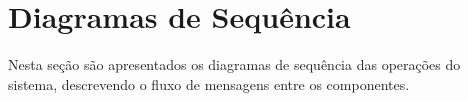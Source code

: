 \section{Diagramas de Sequência}

Nesta seção são apresentados os diagramas de sequência das operações do sistema,
descrevendo o fluxo de mensagens entre os componentes.




